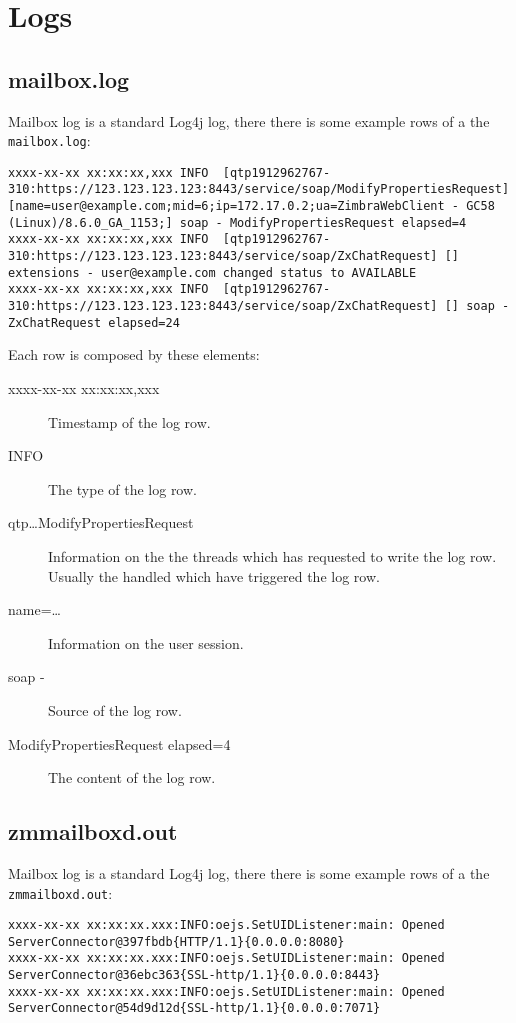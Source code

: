 \section{Logs}
\label{sect:logs}

\subsection{mailbox.log}
\label{sect:mailboxlog}

    Mailbox log is a standard Log4j log, there there is some example rows of a the \verb+mailbox.log+:
    \begin{lstlisting}[breaklines]
xxxx-xx-xx xx:xx:xx,xxx INFO  [qtp1912962767-310:https://123.123.123.123:8443/service/soap/ModifyPropertiesRequest] [name=user@example.com;mid=6;ip=172.17.0.2;ua=ZimbraWebClient - GC58 (Linux)/8.6.0_GA_1153;] soap - ModifyPropertiesRequest elapsed=4
xxxx-xx-xx xx:xx:xx,xxx INFO  [qtp1912962767-310:https://123.123.123.123:8443/service/soap/ZxChatRequest] [] extensions - user@example.com changed status to AVAILABLE
xxxx-xx-xx xx:xx:xx,xxx INFO  [qtp1912962767-310:https://123.123.123.123:8443/service/soap/ZxChatRequest] [] soap - ZxChatRequest elapsed=24
    \end{lstlisting}
    Each row is composed by these elements:
    \begin{description}
        \item [xxxx-xx-xx xx:xx:xx,xxx] Timestamp of the log row.
        \item [INFO] The type of the log row.
        \item [qtp\ldots{}ModifyPropertiesRequest] Information on the the threads which has requested to write the log row.
            Usually the handled which have triggered the log row.
        \item [name=\ldots{}] Information
            on the user session.
        \item [soap -] Source of the log row.
        \item [ModifyPropertiesRequest elapsed=4] The content of the log row.
    \end{description}

\subsection{zmmailboxd.out}
\label{sect:zmmailboxdout}

    Mailbox log is a standard Log4j log, there there is some example rows of a the \verb+zmmailboxd.out+:
    \begin{lstlisting}[breaklines]
xxxx-xx-xx xx:xx:xx.xxx:INFO:oejs.SetUIDListener:main: Opened ServerConnector@397fbdb{HTTP/1.1}{0.0.0.0:8080}
xxxx-xx-xx xx:xx:xx.xxx:INFO:oejs.SetUIDListener:main: Opened ServerConnector@36ebc363{SSL-http/1.1}{0.0.0.0:8443}
xxxx-xx-xx xx:xx:xx.xxx:INFO:oejs.SetUIDListener:main: Opened ServerConnector@54d9d12d{SSL-http/1.1}{0.0.0.0:7071}
    \end{lstlisting}
